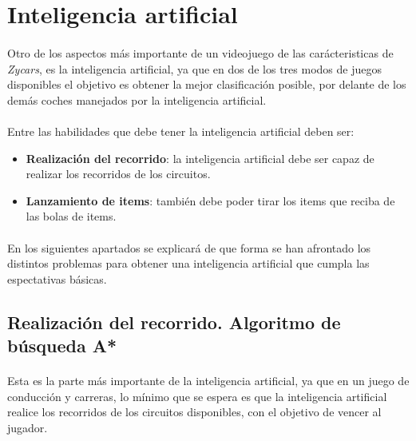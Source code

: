 \section{Inteligencia artificial}

\paragraph{}
Otro de los aspectos más importante de un videojuego de las carácteristicas de \emph{Zycars}, es la inteligencia artificial,
ya que en dos de los tres modos de juegos disponibles el objetivo es obtener la mejor clasificación posible, por delante
de los demás coches manejados por la inteligencia artificial.

\paragraph{}
Entre las habilidades que debe tener la inteligencia artificial deben ser:

\begin{itemize}
    \item \textbf{Realización del recorrido}: la inteligencia artificial debe ser capaz de realizar los recorridos de los
    circuitos.
    
    \item \textbf{Lanzamiento de items}: también debe poder tirar los items que reciba de las bolas de items.
\end{itemize}

\paragraph{}
En los siguientes apartados se explicará de que forma se han afrontado los distintos problemas para obtener una inteligencia
artificial que cumpla las espectativas básicas.

\subsection{Realización del recorrido. Algoritmo de búsqueda A*}

\paragraph{}
Esta es la parte más importante de la inteligencia artificial, ya que en un juego de conducción y carreras, lo mínimo que se 
espera es que la inteligencia artificial realice los recorridos de los circuitos disponibles, con el objetivo de vencer al
jugador.

